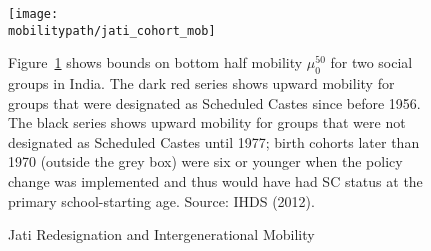 \newpage 
\begin{figure}[H]
  \caption{Jati Redesignation and Intergenerational Mobility} 
  \label{fig:cassan}
  \begin{center}    
      \texttt{[image: \\mobilitypath/jati\_cohort\_mob]}
  \end{center}
  \newline
  \footnotesize{Figure~\ref{fig:cassan} shows bounds on bottom half
    mobility $\mu_0^{50}$ for two social groups in India. The dark red
    series shows upward mobility for groups that were designated as
    Scheduled Castes since before 1956. The black series shows
    upward mobility for groups that were not designated as Scheduled
    Castes until 1977; birth cohorts later than 1970 (outside the grey
    box) were six or younger when the policy change was implemented and thus would have had SC status at the primary school-starting age. Source: IHDS
    (2012).}
\end{figure}

